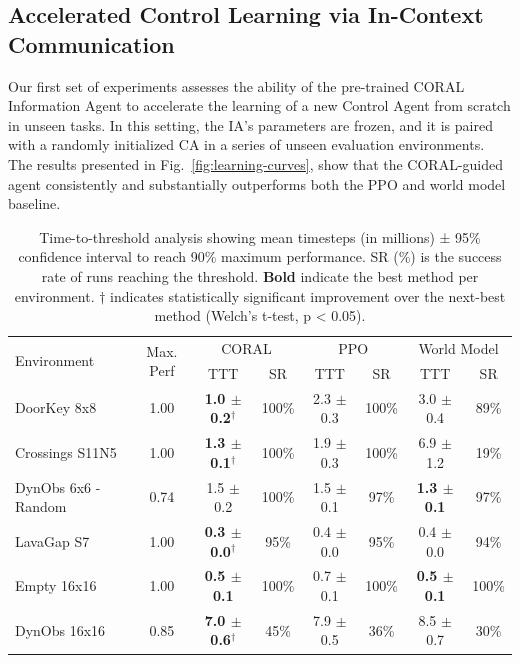 \documentclass[letterpaper]{article}
\begin{document}
\subsection{Accelerated Control Learning via In-Context Communication}
Our first set of experiments assesses the ability of the pre-trained CORAL Information Agent to accelerate the learning of a new Control Agent from scratch in unseen tasks. In this setting, the IA's parameters are frozen, and it is paired with a randomly initialized CA in a series of unseen evaluation environments. The results presented in Fig.~\ref{fig:learning-curves}, show that the CORAL-guided agent consistently and substantially outperforms both the PPO and world model baseline.
\begin{table}[bt]
\vspace{-5pt}
\centering
  \begin{tabular}{l c cc cc cc}
    \toprule
    \multirow{2}{*}{Environment} &
    \multirow{2}{*}{Max. Perf} &
    \multicolumn{2}{c}{\textcolor[HTML]{923BE5}{CORAL}} &
    \multicolumn{2}{c}{\textcolor[HTML]{339332}{PPO}} &
    \multicolumn{2}{c}{\textcolor[HTML]{DD264A}{World Model}} \\
      & & TTT & SR & TTT & SR & TTT & SR \\
    \midrule
DoorKey 8x8 & 1.00 & \textbf{1.0 $\pm$ 0.2$^{\dag}$} & 100\% & 2.3 $\pm$ 0.3 & 100\% & 3.0 $\pm$ 0.4 & 89\% \\
Crossings S11N5 & 1.00 & \textbf{1.3 $\pm$ 0.1$^{\dag}$} & 100\% & 1.9 $\pm$ 0.3 & 100\% & 6.9 $\pm$ 1.2 & 19\% \\
DynObs 6x6 - Random & 0.74 & 1.5 $\pm$ 0.2 & 100\% & 1.5 $\pm$ 0.1 & 97\% & \textbf{1.3 $\pm$ 0.1} & 97\% \\
LavaGap S7 & 1.00 & \textbf{0.3 $\pm$ 0.0$^{\dag}$} & 95\% & 0.4 $\pm$ 0.0 & 95\% & 0.4 $\pm$ 0.0 & 94\% \\
Empty 16x16 & 1.00 & \textbf{0.5 $\pm$ 0.1} & 100\% & 0.7 $\pm$ 0.1 & 100\% & \textbf{0.5 $\pm$ 0.1} & 100\% \\
DynObs 16x16 & 0.85 & \textbf{7.0 $\pm$ 0.6$^{\dag}$} & 45\% & 7.9 $\pm$ 0.5 & 36\% & 8.5 $\pm$ 0.7 & 30\% \\
    \bottomrule
  \end{tabular}
\vspace{-5pt}
\caption{Time-to-threshold analysis showing mean timesteps (in millions) ± 95\% confidence interval to reach 90\% maximum performance. SR (\%) is the success rate of runs reaching the threshold. \textbf{Bold} indicate the best method per environment. ${\dag}$ indicates statistically significant improvement over the next-best method (Welch’s t-test, p < 0.05).}
\label{table: TTT}
\vspace{-5pt}
\end{table}
\end{document}
